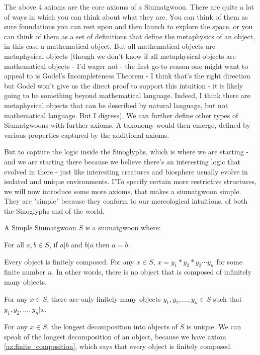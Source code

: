The above 4 axioms are the core axioms of a Siumatgwoon. There are quite a lot of ways in which you can think about what they are. You can think of them as sure foundations you can rest upon and then launch to explore the space, or you can think of them as a set of definitions that define the metaphysics of an object, in this case a mathematical object. But all mathematical objects are metaphysical objects (though we don't know if all metaphysical objects are mathematical objects - I'd wager not - the first go-to reason one might want to appeal to is Godel's Incompleteness Theorem - I think that's the right direction but Godel won't give us the direct proof to support this intuition - it is likely going to be something beyond mathematical language. Indeed, I think there are metaphysical objects that can be described by natural language, but not mathematical language. But I digress). We can further define other types of Siumatgwoons with further axioms. A taxonomy would then emerge, defined by various properties captured by the additional axioms.

But to capture the logic inside the Sinoglyphs, which is where we are starting - and we are starting there because we believe there's an interesting logic that evolved in there - just like interesting creatures and biosphere usually evolve in isolated and unique environments. I'To specify certain more restrictive structures, we will now introduce some more axioms, that makes a siumatgwoon simple. They are "simple" because they conform to our mereological intuitions, of both the Sinoglyphs and of the world.

\begin{definition}\label{def:simple}
A Simple Siumatgwoon $S$ is a siumatgwoon where:
\begin{axiom}[Antisymmetry]\label{ax:antisymmetry}
    For all $a,b\in S$, if $a|b$ and $b|a$ then $a=b$.
\end{axiom}
\begin{axiom}\label{ax:finite_composition} 
    Every object is finitely composed. For any $x\in S$, $x = y_1 * y_2 * y_3 \cdots y_n$ for some finite number $n$.
    In other words, there is no object that is composed of infinitely many objects.
\end{axiom}
    
\begin{axiom}\label{ax:finite_constitution} 
For any $x \in S$, there are only finitely many objects $y_1, y_2, \ldots, y_n \in S$ such that $y_1, y_2, \ldots, y_n | x$.
\end{axiom}

\begin{axiom}\label{ax:unique-decomposition} 
    For any $x\in S$, the longest decomposition into objects of $S$ is unique. We can speak of the longest decomposition of an object, because we have axiom \ref{ax:finite_composition}, which says that every object is finitely composed.
\end{axiom}
\end{definition}

